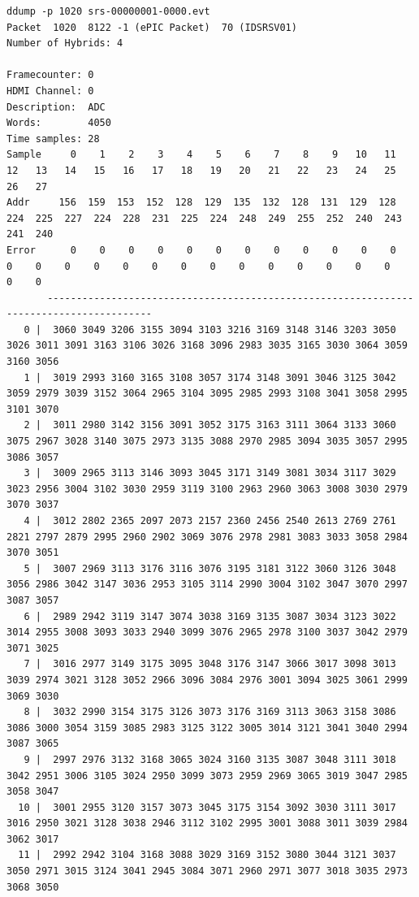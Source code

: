 \documentclass{article}[11pt]
\begin{document}
\begin{Verbatim}[fontsize=\tiny]
ddump -p 1020 srs-00000001-0000.evt
Packet  1020  8122 -1 (ePIC Packet)  70 (IDSRSV01)
Number of Hybrids: 4

Framecounter: 0
HDMI Channel: 0
Description:  ADC
Words:        4050
Time samples: 28
Sample     0    1    2    3    4    5    6    7    8    9   10   11   12   13   14   15   16   17   18   19   20   21   22   23   24   25   26   27
Addr     156  159  153  152  128  129  135  132  128  131  129  128  224  225  227  224  228  231  225  224  248  249  255  252  240  243  241  240
Error      0    0    0    0    0    0    0    0    0    0    0    0    0    0    0    0    0    0    0    0    0    0    0    0    0    0    0    0
       ----------------------------------------------------------------------------------------
   0 |  3060 3049 3206 3155 3094 3103 3216 3169 3148 3146 3203 3050 3026 3011 3091 3163 3106 3026 3168 3096 2983 3035 3165 3030 3064 3059 3160 3056
   1 |  3019 2993 3160 3165 3108 3057 3174 3148 3091 3046 3125 3042 3059 2979 3039 3152 3064 2965 3104 3095 2985 2993 3108 3041 3058 2995 3101 3070
   2 |  3011 2980 3142 3156 3091 3052 3175 3163 3111 3064 3133 3060 3075 2967 3028 3140 3075 2973 3135 3088 2970 2985 3094 3035 3057 2995 3086 3057
   3 |  3009 2965 3113 3146 3093 3045 3171 3149 3081 3034 3117 3029 3023 2956 3004 3102 3030 2959 3119 3100 2963 2960 3063 3008 3030 2979 3070 3037
   4 |  3012 2802 2365 2097 2073 2157 2360 2456 2540 2613 2769 2761 2821 2797 2879 2995 2960 2902 3069 3076 2978 2981 3083 3033 3058 2984 3070 3051
   5 |  3007 2969 3113 3176 3116 3076 3195 3181 3122 3060 3126 3048 3056 2986 3042 3147 3036 2953 3105 3114 2990 3004 3102 3047 3070 2997 3087 3057
   6 |  2989 2942 3119 3147 3074 3038 3169 3135 3087 3034 3123 3022 3014 2955 3008 3093 3033 2940 3099 3076 2965 2978 3100 3037 3042 2979 3071 3025
   7 |  3016 2977 3149 3175 3095 3048 3176 3147 3066 3017 3098 3013 3039 2974 3021 3128 3052 2966 3096 3084 2976 3001 3094 3025 3061 2999 3069 3030
   8 |  3032 2990 3154 3175 3126 3073 3176 3169 3113 3063 3158 3086 3086 3000 3054 3159 3085 2983 3125 3122 3005 3014 3121 3041 3040 2994 3087 3065
   9 |  2997 2976 3132 3168 3065 3024 3160 3135 3087 3048 3111 3018 3042 2951 3006 3105 3024 2950 3099 3073 2959 2969 3065 3019 3047 2985 3058 3047
  10 |  3001 2955 3120 3157 3073 3045 3175 3154 3092 3030 3111 3017 3016 2950 3021 3128 3038 2946 3112 3102 2995 3001 3088 3011 3039 2984 3062 3017
  11 |  2992 2942 3104 3168 3088 3029 3169 3152 3080 3044 3121 3037 3050 2971 3015 3124 3041 2945 3084 3071 2960 2971 3077 3018 3035 2973 3068 3050

\end{Verbatim}
\end{document}
